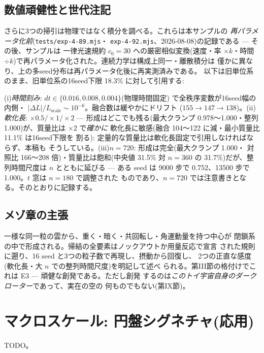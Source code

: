 \documentclass[a4paper,10pt,twocolumn]{ltjsarticle}
\begin{document}
\subsection{数値頑健性と世代注記}

さらに3つの掃引は物理ではなく積分を調べる。これらは本サンプルの
\emph{再パラメータ化前}(\texttt{tests/exp-4-89.mjs}・
\texttt{exp-4-92.mjs}、2026-08-08)の記録である — その後、サンプルは
一律光速規約 $c_0=30$ への厳密相似変換(速度・率 $\times k$・時間
$\div k$)で再パラメータ化された。連続力学は構成上同一・離散積分は
僅かに異なり、上の多seed分布は再パラメータ化後に再実測済みである。
以下は旧単位系のまま、旧単位系の16seed下限 18.3\% に対して引用する:

(i)\emph{時間刻み}: $dt \in \{0.016, 0.008, 0.004\}$(物理時間固定)
で全秩序変数が16seed幅の内側・
$|\Delta L|/L_{\mathrm{scale}}\sim10^{-6}$。融合数は緩やかにドリフト
($155\rightarrow147\rightarrow138$)。(ii)\emph{軟化長}:
$\times0.5/\times1/\times2$ — 形成はどこでも残る(最大クランプ
0.978〜1.000・整列 1.000)が、質量比は $\times2$ で\emph{確かに}
軟化長に敏感(融合 104〜122 に減・最小質量比 11.1\% は16seed下限を
割る): 定量的な質量比は軟化長固定で引用しなければならず、本稿も
そうしている。(iii)\emph{$n=720$}: 形成は完全(最大クランプ 1.000・
対照比 166〜208 倍)・質量比は飽和(中央値 31.5\% 対 $n=360$ の
31.7\%)だが、整列時間尺度は $n$ とともに延びる — ある seed は
9000 步で 0.752、13500 步で 1.000。$t$ 窓は $n=180$ で調整された
ものであり、$n=720$ では注意書きとなる。そのとおりに記録する。

\subsection{メゾ章の主張}

一様な同一粒の雲から、重く・暗く・共回転し・角運動量を持つ中心が
閉鎖系の中で形成される。帰結の全要素はノックアウトか用量反応で宣言
された規則に遡り、16 seed と3つの粒子数で再現し、摂動から回復し、
2つの正直な感度(軟化長・大 $n$ での整列時間尺度)を明記して述べ
られる。第III節の格付けでこれは E3 — 頑健な創発である。ただし創発
するのは\emph{このトイ宇宙自身のダークローター}であって、実在の空の
何ものでもない(第IX節)。

\section{マクロスケール: 円盤シグネチャ(応用)}
TODO。
\end{document}
